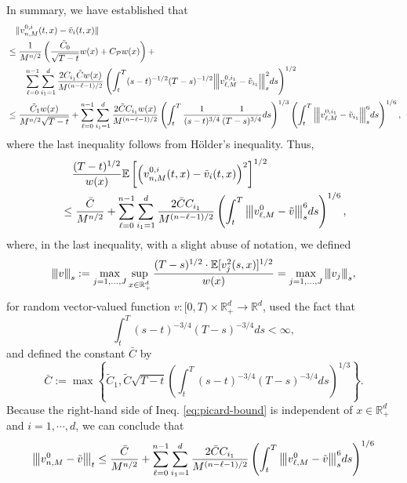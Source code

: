 \documentclass[11pt]{article}
\theoremstyle{definition}
\theoremstyle{plain}
\newcommand{\cP}{{\cal P}}
\newcommand{\vertiii}[1]{{\left\vert\kern-0.25ex\left\vert\kern-0.25ex\left\vert #1 
    \right\vert\kern-0.25ex\right\vert\kern-0.25ex\right\vert}}
\begin{document}
\begin{appendices}
  In summary, we have established that
  \begin{align*}
  &\quad \| v_{n,M}^{0,i}(t,x) - \tilde{v}_{i}(t,x) \| \\
  &\leq \frac{1}{M^{n/2}} \left(\frac{\tilde C_0}{\sqrt{T-t}} w(x) + C_\cP w(x)\right) + \\
  &\qquad \sum_{\ell = 0}^{n-1} \sum_{i_1=1}^d \frac{2C_{i_1}\tilde C w(x) }{M^{(n - \ell - 1)/2}} 
  \left( \int_t^T (s - t)^{-1/2} (T - s)^{-1/2}  \vertiii{v_{\ell,M}^{0,i_1} - \tilde{v}_{i_1}}_s^2 ds \right)^{1/2} \\
  &\leq \frac{\tilde C_1w(x) }{M^{n/2} \sqrt{T-t}} 
  + \sum_{\ell=0}^{n-1} \sum_{i_1=1}^d \frac{2 \tilde C C_{i_1}w(x) }{M^{(n - \ell - 1)/2}} 
  \left( \int_t^T \frac{1}{(s - t)^{3/4}} \frac{1}{(T - s)^{3/4}} ds \right)^{1/3} 
  \left( \int_t^T  \vertiii{v_{\ell,M}^{0,i_1} - \tilde{v}_{i_1}}_s^6 ds \right)^{1/6},
  \end{align*}
  where the last inequality follows from Hölder's inequality. Thus, 
  \begin{align}
  & \quad \frac{(T - t)^{1/2}}{w(x)} 
  \mathbb{E} \left[ \left(v_{n,M}^{0,i}(t,x) - \tilde{v}_{i}(t,x)\right)^2 \right]^{1/2} \nonumber \\
  &\leq \frac{\bar C}{M^{n/2}} + \sum_{\ell=0}^{n-1} \sum_{i_1=1}^d \frac{2 \bar C C_{i_1}}{M^{(n - \ell - 1)/2}} 
  \left( \int_t^T \vertiii{v_{\ell,M}^{0} - \tilde{v}}_s^6 ds \right)^{1/6},
  \label{eq:picard-bound}
  \end{align}
  where, in the last inequality, with a slight abuse of notation, we defined
  \[
  \vertiii{v}_{s} := \max_{j=1,\dots,J} \sup_{x \in \mathbb{R}_+^d} 
  \frac{(T - s)^{1/2} \cdot \mathbb{E}[ v_j^2(s,x) ]^{1/2}}{w(x)}
  = \max_{j=1,\dots,J} \vertiii{v_j}_s,
  \]
  for random vector-valued function \( v : [0,T) \times \mathbb{R}_+^d \to \mathbb{R}^d \), used the fact that
  \[
  \int_t^T (s - t)^{-3/4} (T - s)^{-3/4} ds < \infty, 
  \]
  and defined the constant $\bar C$ by
  \[
  \bar C := \max\left\{\tilde C_1, \tilde C \sqrt{T-t} \left(\int_t^T (s - t)^{-3/4} (T - s)^{-3/4} ds\right)^{1/3} \right\}.
  \]
  Because the right-hand side of Ineq. \eqref{eq:picard-bound} is independent of $x \in \mathbb{R}_+^d$ and $i = 1, \cdots, d$,
  we can conclude that
  \begin{align*}
  \vertiii{v_{n,M}^{0} - \tilde{v}}_{t} 
  &\leq \frac{\bar C}{M^{n/2}} + \sum_{\ell=0}^{n-1} \sum_{i_1=1}^d \frac{2 \bar C C_{i_1}}{M^{(n - \ell - 1)/2}} 
  \left( \int_t^T \vertiii{v_{\ell,M}^{0} - \tilde{v}}_s^6 ds \right)^{1/6} \\

\end{align*}
\end{appendices}
\end{document}
